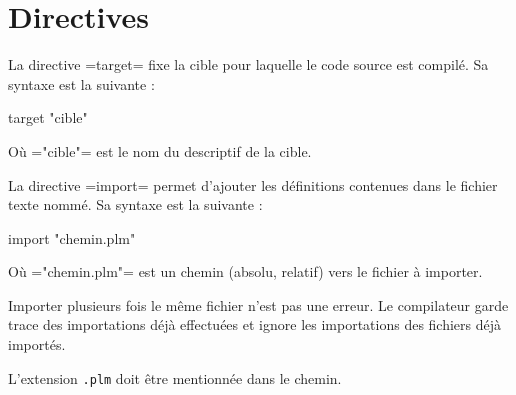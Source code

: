 




\chapter{Directives}




La directive \plm=target= fixe la cible pour laquelle le code source est compilé. Sa syntaxe est la suivante :
\begin{PLM}
target "cible"
\end{PLM} 
Où \plm="cible"= est le nom du descriptif de la cible.







La directive \plm=import= permet d'ajouter les définitions contenues dans le fichier texte nommé. Sa syntaxe est la suivante :
\begin{PLM}
import "chemin.plm"
\end{PLM} 
Où \plm="chemin.plm"= est un chemin (absolu, relatif) vers le fichier à importer.

Importer plusieurs fois le même fichier n'est pas une erreur. Le compilateur garde trace des importations déjà effectuées et ignore les importations des fichiers déjà importés.

L'extension \texttt{.plm} doit être mentionnée dans le chemin.